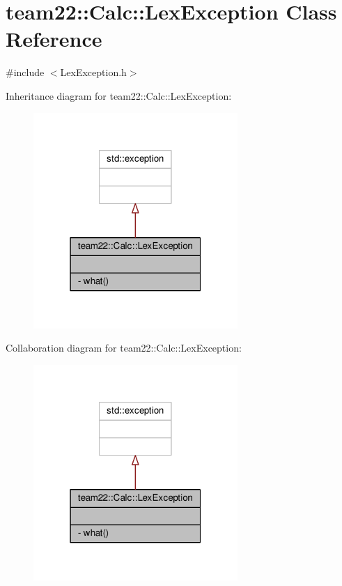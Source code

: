 \hypertarget{classteam22_1_1_calc_1_1_lex_exception}{}\section{team22\+:\+:Calc\+:\+:Lex\+Exception Class Reference}
\label{classteam22_1_1_calc_1_1_lex_exception}


{\ttfamily \#include $<$Lex\+Exception.\+h$>$}



Inheritance diagram for team22\+:\+:Calc\+:\+:Lex\+Exception\+:
\nopagebreak
\begin{figure}[H]
\begin{center}
\leavevmode
\includegraphics[width=220pt]{classteam22_1_1_calc_1_1_lex_exception__inherit__graph}
\end{center}
\end{figure}


Collaboration diagram for team22\+:\+:Calc\+:\+:Lex\+Exception\+:
\nopagebreak
\begin{figure}[H]
\begin{center}
\leavevmode
\includegraphics[width=220pt]{classteam22_1_1_calc_1_1_lex_exception__coll__graph}
\end{center}
\end{figure}
